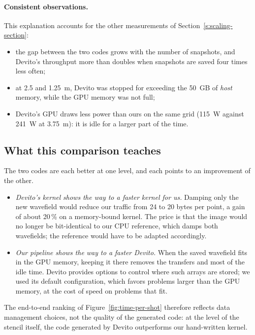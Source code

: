 \documentclass[letterpaper,11pt,leqno]{article}
\begin{document}
\paragraph{Consistent observations.}
This explanation accounts for the other measurements of Section~\ref{s:scaling-section}:
\begin{itemize}
\item the gap between the two codes grows with the number of snapshots, and
  Devito's throughput more than doubles when snapshots are saved four times less
  often;
\item at 2.5 and 1.25~m, Devito was stopped for exceeding the 50~GB of \emph{host}
  memory, while the GPU memory was not full;
\item Devito's GPU draws less power than ours on the same grid (115~W against
  241~W at 3.75~m): it is idle for a larger part of the time.
\end{itemize}

\subsection{What this comparison teaches}

The two codes are each better at one level, and each points to an improvement of
the other.
\begin{itemize}
\item \emph{Devito's kernel shows the way to a faster kernel for us.} Damping only
  the new wavefield would reduce our traffic from 24 to 20 bytes per point, a gain
  of about 20\,\% on a memory-bound kernel. The price is that the image would no
  longer be bit-identical to our CPU reference, which damps both wavefields; the
  reference would have to be adapted accordingly.
\item \emph{Our pipeline shows the way to a faster Devito.} When the saved
  wavefield fits in the GPU memory, keeping it there removes the transfers and
  most of the idle time. Devito provides options to control where such arrays are
  stored; we used its default configuration, which favors problems larger than
  the GPU memory, at the cost of speed on problems that fit.
\end{itemize}
The end-to-end ranking of Figure~\ref{fig:time-per-shot} therefore reflects data
management choices, not the quality of the generated code: at the level of the
stencil itself, the code generated by Devito outperforms our hand-written kernel.
\end{document}
